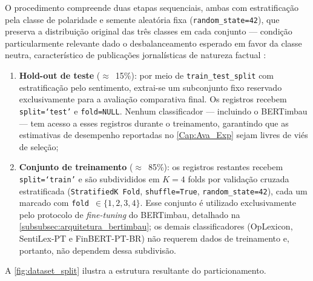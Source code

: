 O procedimento compreende duas etapas sequenciais, ambas com estratificação pela classe de polaridade e semente aleatória fixa (\texttt{random\_state=42}), que preserva a distribuição original das três classes em cada conjunto — condição particularmente relevante dado o desbalanceamento esperado em favor da classe neutra, característico de publicações jornalísticas de natureza factual \cite{loughran2011}:

\begin{enumerate}
	\item \textbf{Hold-out de teste} ($\approx$~15\%): por meio de \texttt{train\_test\_split} com estratificação pelo sentimento, extrai-se um subconjunto fixo reservado exclusivamente para a avaliação comparativa final. Os registros recebem \texttt{split=`test'} e \texttt{fold=NULL}. Nenhum classificador — incluindo o BERTimbau — tem acesso a esses registros durante o treinamento, garantindo que as estimativas de desempenho reportadas no \autoref{Cap:Ava_Exp} sejam livres de viés de seleção;
	
	\item \textbf{Conjunto de treinamento} ($\approx$~85\%): os registros restantes recebem \texttt{split=`train'} e são subdivididos em $K=4$ folds por validação cruzada estratificada (\texttt{StratifiedK Fold}, \texttt{shuffle=True}, \texttt{random\_state=42}), cada um marcado com \texttt{fold}~$\in \{1, 2, 3, 4\}$. Esse conjunto é utilizado exclusivamente pelo protocolo de \textit{fine-tuning} do BERTimbau, detalhado na \autoref{subsubsec:arquitetura_bertimbau}; os demais classificadores (OpLexicon, SentiLex-PT e FinBERT-PT-BR) não requerem dados de treinamento e, portanto, não dependem dessa subdivisão.
\end{enumerate}

A \autoref{fig:dataset_split} ilustra a estrutura resultante do particionamento.


